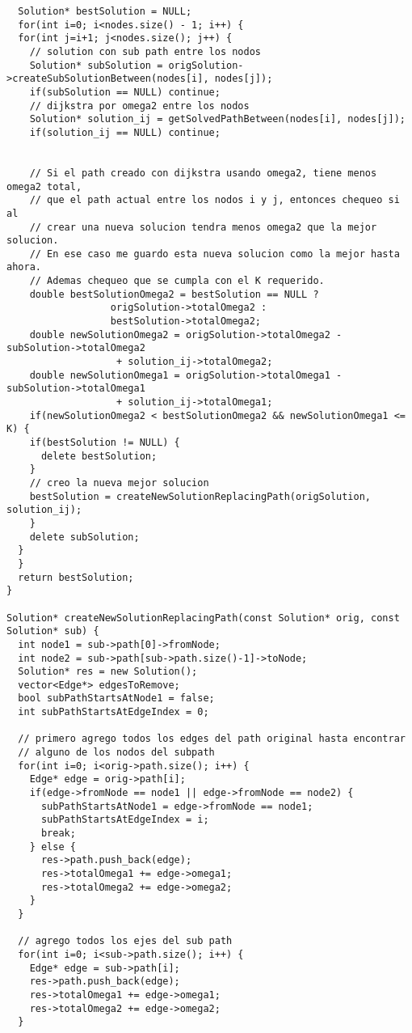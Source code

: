 \begin{verbatim}
  Solution* bestSolution = NULL;
  for(int i=0; i<nodes.size() - 1; i++) {  
  for(int j=i+1; j<nodes.size(); j++) {       
    // solution con sub path entre los nodos
    Solution* subSolution = origSolution->createSubSolutionBetween(nodes[i], nodes[j]); 
    if(subSolution == NULL) continue; 
    // dijkstra por omega2 entre los nodos
    Solution* solution_ij = getSolvedPathBetween(nodes[i], nodes[j]); 
    if(solution_ij == NULL) continue;
    
    
    // Si el path creado con dijkstra usando omega2, tiene menos omega2 total, 
    // que el path actual entre los nodos i y j, entonces chequeo si al 
    // crear una nueva solucion tendra menos omega2 que la mejor solucion.
    // En ese caso me guardo esta nueva solucion como la mejor hasta ahora.
    // Ademas chequeo que se cumpla con el K requerido.              
    double bestSolutionOmega2 = bestSolution == NULL ? 
                  origSolution->totalOmega2 : 
                  bestSolution->totalOmega2;
    double newSolutionOmega2 = origSolution->totalOmega2 - subSolution->totalOmega2
                   + solution_ij->totalOmega2;
    double newSolutionOmega1 = origSolution->totalOmega1 - subSolution->totalOmega1
                   + solution_ij->totalOmega1;    
    if(newSolutionOmega2 < bestSolutionOmega2 && newSolutionOmega1 <= K) {       
    if(bestSolution != NULL) {
      delete bestSolution;   
    }     
    // creo la nueva mejor solucion
    bestSolution = createNewSolutionReplacingPath(origSolution, solution_ij);      
    }    
    delete subSolution;
  }
  }
  return bestSolution;  
}

Solution* createNewSolutionReplacingPath(const Solution* orig, const Solution* sub) {
  int node1 = sub->path[0]->fromNode;
  int node2 = sub->path[sub->path.size()-1]->toNode;
  Solution* res = new Solution();
  vector<Edge*> edgesToRemove;
  bool subPathStartsAtNode1 = false;
  int subPathStartsAtEdgeIndex = 0;
  
  // primero agrego todos los edges del path original hasta encontrar 
  // alguno de los nodos del subpath
  for(int i=0; i<orig->path.size(); i++) {
    Edge* edge = orig->path[i];
    if(edge->fromNode == node1 || edge->fromNode == node2) {
      subPathStartsAtNode1 = edge->fromNode == node1;
      subPathStartsAtEdgeIndex = i;
      break;
    } else {
      res->path.push_back(edge);
      res->totalOmega1 += edge->omega1;
      res->totalOmega2 += edge->omega2;
    }
  }

  // agrego todos los ejes del sub path
  for(int i=0; i<sub->path.size(); i++) {
    Edge* edge = sub->path[i];
    res->path.push_back(edge);
    res->totalOmega1 += edge->omega1;
    res->totalOmega2 += edge->omega2;
  }


\end{verbatim}
